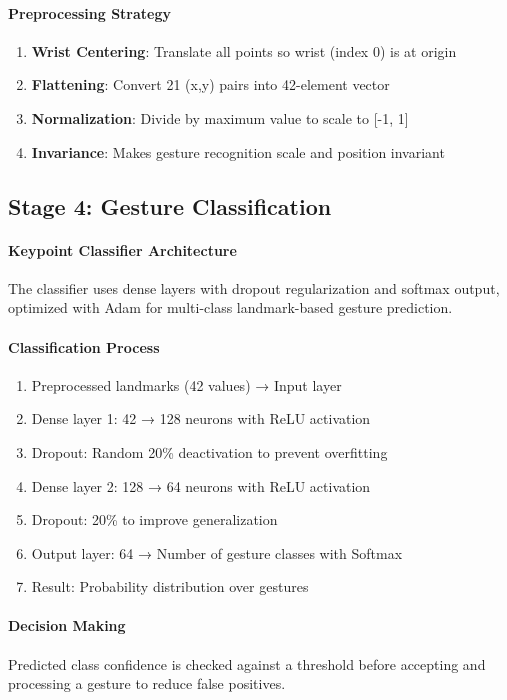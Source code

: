\paragraph{Preprocessing Strategy}
\begin{enumerate}
    \item \textbf{Wrist Centering}: Translate all points so wrist (index 0) is at origin
    \item \textbf{Flattening}: Convert 21 (x,y) pairs into 42-element vector
    \item \textbf{Normalization}: Divide by maximum value to scale to [-1, 1]
    \item \textbf{Invariance}: Makes gesture recognition scale and position invariant
\end{enumerate}

\subsection{Stage 4: Gesture Classification}

\paragraph{Keypoint Classifier Architecture}
The classifier uses dense layers with dropout regularization and softmax output, optimized with Adam for multi-class landmark-based gesture prediction.

\paragraph{Classification Process}

\begin{enumerate}
    \item Preprocessed landmarks (42 values) → Input layer
    \item Dense layer 1: 42 → 128 neurons with ReLU activation
    \item Dropout: Random 20\% deactivation to prevent overfitting
    \item Dense layer 2: 128 → 64 neurons with ReLU activation
    \item Dropout: 20\% to improve generalization
    \item Output layer: 64 → Number of gesture classes with Softmax
    \item Result: Probability distribution over gestures
\end{enumerate}

\paragraph{Decision Making}
Predicted class confidence is checked against a threshold before accepting and processing a gesture to reduce false positives.

